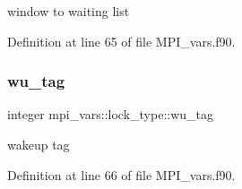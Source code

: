 window to waiting list 



Definition at line 65 of file M\+P\+I\+\_\+vars.\+f90.

\mbox{\label{structmpi__vars_1_1lock__type_ae13a02ff3985d06c3455b2ae29210cc4}} 
\subsubsection{\texorpdfstring{wu\+\_\+tag}{wu\_tag}}
{\footnotesize\ttfamily integer mpi\+\_\+vars\+::lock\+\_\+type\+::wu\+\_\+tag}



wakeup tag 



Definition at line 66 of file M\+P\+I\+\_\+vars.\+f90.



